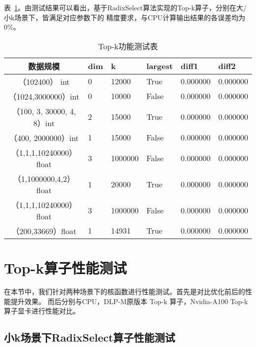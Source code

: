 表~\ref{tab:presicionbigk}。由测试结果可以看出，基于RadixSelect算法实现的Top-k算子，分别在大/小k场景下，皆满足对应参数下的
精度要求，与CPU计算输出结果的各误差均为0\%。
\begin{table}
    \centering
    \caption{Top-k功能测试表}
    \label{tab:presicionbigk}
    \begin{tabular}{clllll}
        \toprule
        数据规模       &dim  & k  & largest & diff1    & diff2 \\
        \midrule
        （102400） int&0&  12000     & True      & 0.000000 & 0.000000 \\
        （1024,3000000）int&0 & 10000 & False      & 0.000000 & 0.000000 \\
        （100, 3, 30000, 4, 8）int&2 & 15000 & True      & 0.000000 & 0.000000 \\
        （400, 2000000）int&1 & 15000 & False      & 0.000000 & 0.000000 \\
        
        （1,1,1,10240000）float &3& 1000000 & False      & 0.000000 & 0.000000 \\
        （1,1000000,4,2）float  &1 & 20000 & True      & 0.000000 & 0.000000 \\
        （1,1,1,10240000）float&3 & 1000000 & False      & 0.000000 & 0.000000 \\
        （200,33669）float&1 & 14931 & True      & 0.000000 & 0.000000 \\
    
    \bottomrule
    \end{tabular}
    \end{table}

\section{Top-k算子性能测试}
在本节中，我们针对两种场景下的核函数进行性能测试。首先是对比优化前后的性能提升效果。
而后分别与CPU，DLP-M原版本 Top-k 算子，Nvidia-A100 Top-k 算子显卡进行性能对比。
\subsection{小k场景下RadixSelect算子性能测试}
